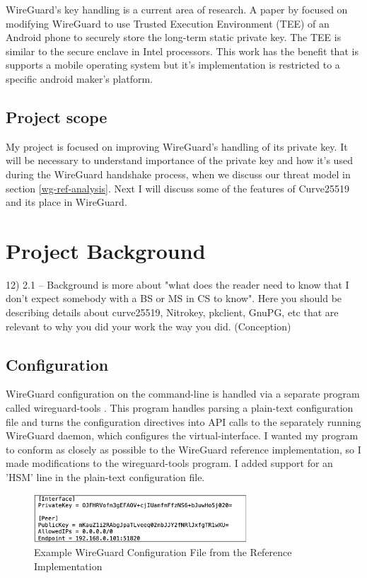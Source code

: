 \documentclass [11pt, proquest] {uwthesis}[2020/02/24]
\begin{document}
WireGuard's key handling is a current area of research. A paper by \cite{wu_sewg_2020} focused on modifying WireGuard to use Trusted Execution Environment (TEE) of an Android phone to securely store the long-term static private key. The TEE is similar to the secure enclave in Intel processors. This work has the benefit that is supports a mobile operating system but it's implementation is restricted to a specific android maker's platform.

\section {Project scope}

My project is focused on improving WireGuard's handling of its private key.
It will be necessary to understand importance of the private key and how it's used during the WireGuard handshake process, when we discuss our threat model in section \ref{wg-ref-analysis}. Next I will discuss some of the features of Curve25519 and its place in WireGuard.


\chapter {Project Background}

12)  2.1 -- Background is more about "what does the reader need to know that I don't expect somebody with a BS or MS in CS to know". Here you should be describing details about curve25519, Nitrokey, pkclient, GnuPG, etc that are relevant to why you did your work the way you did. (Conception)

\section{Configuration}
WireGuard configuration on the command-line is handled via a separate program called wireguard-tools \cite{noauthor_wireguard-tools_2022}. This program handles parsing a plain-text configuration file and turns the configuration directives into API calls to the separately running WireGuard daemon, which configures the virtual-interface. I wanted my program to conform as closely as possible to the WireGuard reference implementation, so I made modifications to the wireguard-tools program. I added support for an 'HSM' line in the plain-text configuration file. 
\begin{figure}[ht]
\includegraphics[width=8cm]{paper/images/wg_conf_std.png}
\caption{Example WireGuard Configuration File from the Reference Implementation}
\label{fig:wg_config}
\end{figure}
\end{document}
